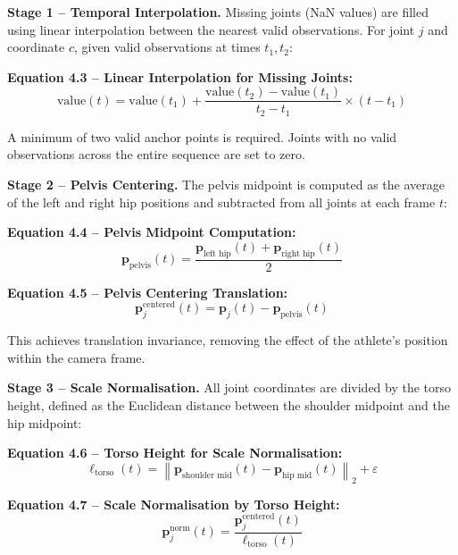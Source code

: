 \begin{sloppypar}
\textbf{Stage 1 -- Temporal Interpolation.} Missing joints (NaN values) are filled using linear interpolation between the nearest valid observations. For joint $j$ and coordinate $c$, given valid observations at times $t_1, t_2$:

\textbf{Equation 4.3 -- Linear Interpolation for Missing Joints:}
\begin{equation}
\text{value}(t) = \text{value}(t_1) + \frac{\text{value}(t_2) - \text{value}(t_1)}{t_2 - t_1} \times (t - t_1)
\tag{4.3}
\end{equation}

A minimum of two valid anchor points is required. Joints with no valid observations across the entire sequence are set to zero.

\textbf{Stage 2 -- Pelvis Centering.} The pelvis midpoint is computed as the average of the left and right hip positions and subtracted from all joints at each frame $t$:

\textbf{Equation 4.4 -- Pelvis Midpoint Computation:}
\begin{equation}
\mathbf{p}_{\text{pelvis}}(t) = \frac{\mathbf{p}_{\text{left hip}}(t) + \mathbf{p}_{\text{right hip}}(t)}{2}
\tag{4.4}
\end{equation}

\textbf{Equation 4.5 -- Pelvis Centering Translation:}
\begin{equation}
\mathbf{p}_{j}^{\text{centered}}(t) = \mathbf{p}_{j}(t) - \mathbf{p}_{\text{pelvis}}(t)
\tag{4.5}
\end{equation}

This achieves translation invariance, removing the effect of the athlete's position within the camera frame.

\textbf{Stage 3 -- Scale Normalisation.} All joint coordinates are divided by the torso height, defined as the Euclidean distance between the shoulder midpoint and the hip midpoint:

\textbf{Equation 4.6 -- Torso Height for Scale Normalisation:}
\begin{equation}
\ell_{\text{torso}}(t) = \left\| \mathbf{p}_{\text{shoulder mid}}(t) - \mathbf{p}_{\text{hip mid}}(t) \right\|_2 + \varepsilon
\tag{4.6}
\end{equation}

\textbf{Equation 4.7 -- Scale Normalisation by Torso Height:}
\begin{equation}
\mathbf{p}_{j}^{\text{norm}}(t) = \frac{\mathbf{p}_{j}^{\text{centered}}(t)}{\ell_{\text{torso}}(t)}
\tag{4.7}
\end{equation}


\end{sloppypar}
